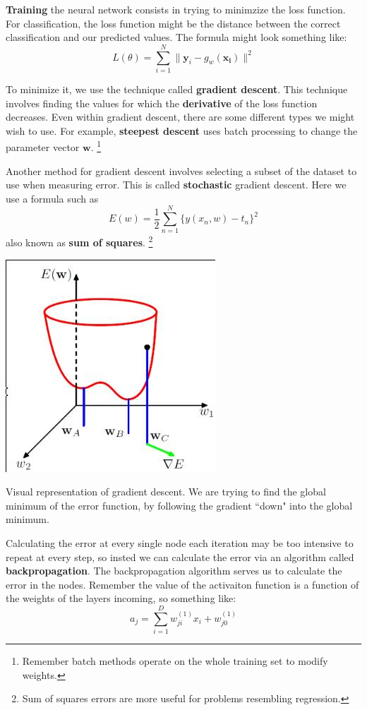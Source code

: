 \documentclass{tufte-handout}
\begin{document}
\textbf{Training} the neural network consists in trying to minimzize the loss function. 
For classification, the loss function might be the distance between the correct classification
	and our predicted values.
The formula might look something like:
\[ L(\theta) = \sum_{i=1}^{N}\|\mathbf{y}_{i} -  g_{w}(\mathbf{x_{i}})\|^{2}\]

To minimize it, we use the technique called \textbf{gradient descent}. 
This technique involves finding the values for which the \textbf{derivative} of the loss function decreases. 
Even within gradient descent, there are some different types we might wish to use. 
For example, \textbf{steepest descent} uses batch processing to change the parameter vector $\mathbf{w}$.
\footnote{Remember batch methods operate on the whole training set to modify weights.}

Another method for gradient descent involves selecting a subset of the dataset to use when measuring 
	error.
This is called \textbf{stochastic} gradient descent. 
Here we use a formula such as 
\[E(w) = \frac{1}{2}\sum_{n=1}^{N}\{y(x_{n}, w) - t_{n}\}^{2}\]
also known as \textbf{sum of squares}.
\footnote{Sum of squares errors are more useful for problems resembling regression.}
\begin{marginfigure}
	\includegraphics[scale=0.3]{gradient_descent}
	\caption{Visual representation of gradient descent. We are trying to find the global
		minimum of the error function, by following the gradient ``down" into the global 
		minimum.}
\end{marginfigure}

Calculating the error at every single node each iteration may be too intensive to repeat at every step,
	so insted we can calculate the error via an algorithm called \textbf{backpropagation}.
The backpropagation algorithm serves us to calculate the error in the nodes. 
Remember the value of
the activaiton function is a function of the weights of the layers incoming, so something like:
\[ a_{j} = \sum_{i=1}^{D}w^{(1)}_{ji}x_{i} + w_{j0}^{(1)}\]
\end{document}
